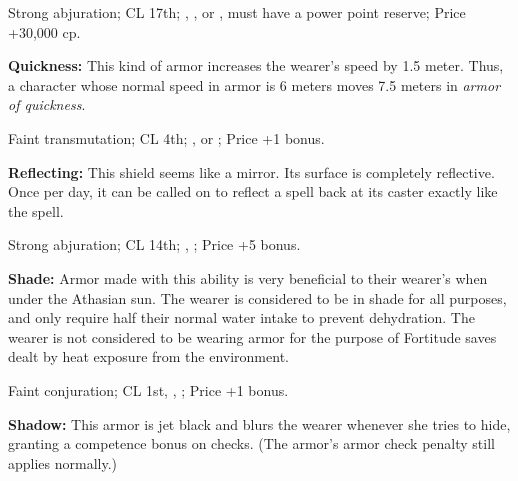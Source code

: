 
Strong abjuration; CL 17th; , ,  or , must have a power point reserve; Price +30,000 cp.

\textbf{Quickness:} This kind of armor increases the wearer's speed by 1.5 meter. Thus, a character whose normal speed in armor is 6 meters moves 7.5 meters in \emph{armor of quickness}.

Faint transmutation; CL 4th; ,  or ; Price +1 bonus.

\textbf{Reflecting:} This shield seems like a mirror. Its surface is completely reflective. Once per day, it can be called on to reflect a spell back at its caster exactly like the  spell.

Strong abjuration; CL 14th; , ; Price +5 bonus. 

\textbf{Shade:} Armor made with this ability is very beneficial to their wearer's when under the Athasian sun. The wearer is considered to be in shade for all purposes, and only require half their normal water intake to prevent dehydration. The wearer is not considered to be wearing armor for the purpose of Fortitude saves dealt by heat exposure from the environment.

Faint conjuration; CL 1st, , ; Price +1 bonus.

\textbf{Shadow:} This armor is jet black and blurs the wearer whenever she tries to hide, granting a competence bonus on  checks. (The armor's armor check penalty still applies normally.)


